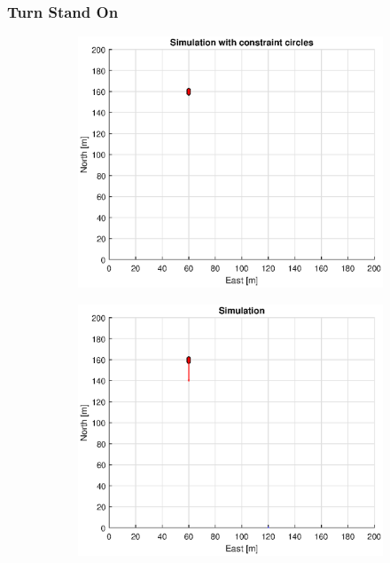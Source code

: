 \subsubsection{Turn Stand On}
\begin{figure}[!b] %
    \begin{subfigure}[b]{0.49\textwidth}
        \centering
        \includegraphics[width=\textwidth]{Images/Figures/sving_SO/Simple0_f1_Frame1}
    \end{subfigure}
    \hfill
    \begin{subfigure}[b]{0.499\textwidth}
        \centering
        \includegraphics[width=\textwidth]{Images/Figures/sving_SO/Simple0_f600_Frame1}

\end{subfigure}
\end{figure}

